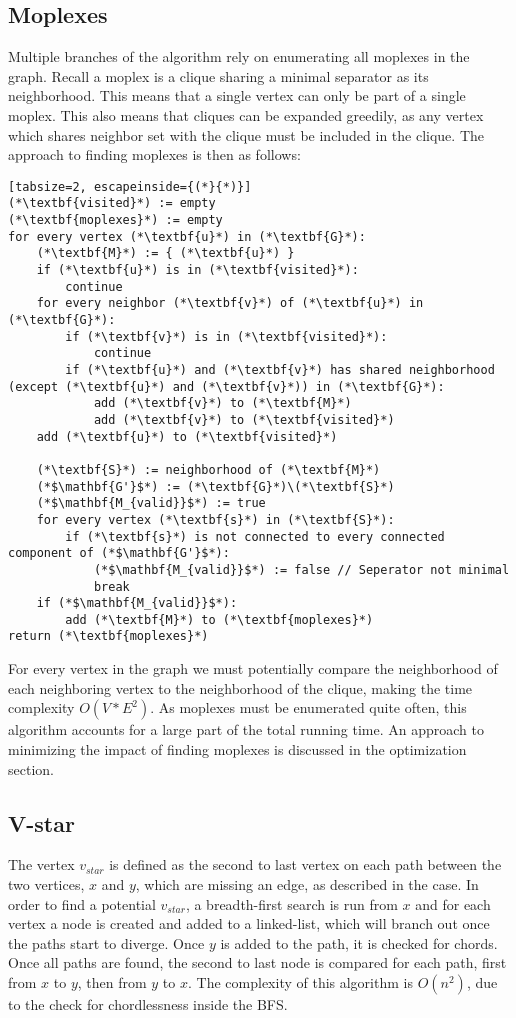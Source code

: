 \documentclass{article}
\begin{document}
		\subsection{Moplexes}
		Multiple branches of the algorithm rely on enumerating all moplexes in the graph.
		Recall a moplex is a clique sharing a minimal separator as its neighborhood.
		This means that a single vertex can only be part of a single moplex.
		This also means that cliques can be expanded greedily, as any vertex which shares neighbor set with the clique must be included in the clique.
		The approach to finding moplexes is then as follows:
		\begin{lstlisting}[tabsize=2, escapeinside={(*}{*)}]
(*\textbf{visited}*) := empty
(*\textbf{moplexes}*) := empty
for every vertex (*\textbf{u}*) in (*\textbf{G}*):
	(*\textbf{M}*) := { (*\textbf{u}*) }
	if (*\textbf{u}*) is in (*\textbf{visited}*):
		continue
	for every neighbor (*\textbf{v}*) of (*\textbf{u}*) in (*\textbf{G}*):
		if (*\textbf{v}*) is in (*\textbf{visited}*):
			continue
		if (*\textbf{u}*) and (*\textbf{v}*) has shared neighborhood (except (*\textbf{u}*) and (*\textbf{v}*)) in (*\textbf{G}*):
			add (*\textbf{v}*) to (*\textbf{M}*)
			add (*\textbf{v}*) to (*\textbf{visited}*)
	add (*\textbf{u}*) to (*\textbf{visited}*)

	(*\textbf{S}*) := neighborhood of (*\textbf{M}*)
	(*$\mathbf{G'}$*) := (*\textbf{G}*)\(*\textbf{S}*)
	(*$\mathbf{M_{valid}}$*) := true
	for every vertex (*\textbf{s}*) in (*\textbf{S}*):
		if (*\textbf{s}*) is not connected to every connected component of (*$\mathbf{G'}$*):
			(*$\mathbf{M_{valid}}$*) := false // Seperator not minimal
			break
	if (*$\mathbf{M_{valid}}$*):
		add (*\textbf{M}*) to (*\textbf{moplexes}*)
return (*\textbf{moplexes}*)
		\end{lstlisting}
		For every vertex in the graph we must potentially compare the neighborhood of each neighboring vertex to the neighborhood of the clique, making the time complexity $O(V*E^2)$.
		As moplexes must be enumerated quite often, this algorithm accounts for a large part of the total running time.
		An approach to minimizing the impact of finding moplexes is discussed in the optimization section.

		\subsection{V-star}
		The vertex $v_{star}$ is defined as the second to last vertex on each path between the two vertices, $x$ and $y$, which are missing an edge, as described in the case.
		In order to find a potential $v_{star}$, a breadth-first search is run from $x$ and for each vertex a node is created and added to a linked-list, which will branch out once the paths start to diverge.
		Once $y$ is added to the path, it is checked for chords.
		Once all paths are found, the second to last node is compared for each path, first from $x$ to $y$, then from $y$ to $x$.
		The complexity of this algorithm is $O(n^2)$, due to the check for chordlessness inside the BFS.
\end{document}

